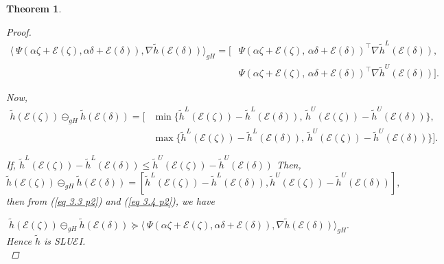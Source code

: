 \documentclass[12pt, reqno]{amsart}
\newtheorem{theorem}{Theorem}[section]
\theoremstyle{definition}
\theoremstyle{remark}
\numberwithin{equation}{section}
\begin{document}
\begin{theorem}
\begin{proof}
\begin{equation*}
\begin{aligned}
    \langle\ {\Psi}( {\alpha} \mathit{\zeta} + \mathcal{\mathcal{E}}(\mathit{\zeta} ), {\alpha}\mathit{\delta} + \mathcal{\mathcal{E}}(\mathit{\delta} )),\nabla  \tilde{h}( \mathcal{\mathcal{E}}(\mathit{\delta} ))\rangle_{gH}
    = \big[
    &\Psi(\alpha \mathit{\zeta}  + \mathcal{\mathcal{E}}(\mathit{\zeta} ),\, \alpha \mathit{\delta}  + \mathcal{\mathcal{E}}(\mathit{\delta} ))^{\!\top}
    \nabla \tilde{h}^L(\mathcal{\mathcal{E}}(\mathit{\delta} )), \\
    &\Psi(\alpha \mathit{\zeta}  + \mathcal{\mathcal{E}}(\mathit{\zeta} ),\, \alpha \mathit{\delta}  + \mathcal{\mathcal{E}}(\mathit{\delta} ))^{\!\top}
    \nabla \tilde{h}^U(\mathcal{\mathcal{E}}(\mathit{\delta} )) 
    \big].
\end{aligned}
\end{equation*}

Now,
\begin{equation*}
\begin{aligned}
\tilde{h}(\mathcal{E}(\zeta)) \ominus_{gH} \tilde{h}(\mathcal{E}(\delta))
= \Big[
    &\min\!\Big\{
        \tilde{h}^L(\mathcal{E}(\zeta)) - \tilde{h}^L(\mathcal{E}(\delta)),\,
        \tilde{h}^U(\mathcal{E}(\zeta)) - \tilde{h}^U(\mathcal{E}(\delta))
    \Big\}, \\
    &\max\!\Big\{
        \tilde{h}^L(\mathcal{E}(\zeta)) - \tilde{h}^L(\mathcal{E}(\delta)),\,
        \tilde{h}^U(\mathcal{E}(\zeta)) - \tilde{h}^U(\mathcal{E}(\delta))
    \Big\}
\Big].
\end{aligned}
\end{equation*}

If, $\tilde{h}^L(\mathcal{\mathcal{E}}(\mathit{\zeta} )) - \tilde{h}^L(\mathcal{\mathcal{E}}(\mathit{\delta} )) \leq \tilde{h}^U(\mathcal{\mathcal{E}}(\mathit{\zeta} )) - \tilde{h}^U(\mathcal{\mathcal{E}}(\mathit{\delta} ))$
Then,
\begin{equation*}
   \tilde{h}(\mathcal{\mathcal{E}}(\mathit{\zeta} )) \ominus_{gH}\tilde{h}(\mathcal{\mathcal{E}}(\mathit{\delta} )) = [\tilde{h}^L(\mathcal{\mathcal{E}}(\mathit{\zeta} )) - \tilde{h}^L(\mathcal{\mathcal{E}}(\mathit{\delta} )), \tilde{h}^U(\mathcal{\mathcal{E}}(\mathit{\zeta} )) - \tilde{h}^U(\mathcal{\mathcal{E}}(\mathit{\delta} ))],
\end{equation*} 
then from (\ref{eq 3.3 p2}) and (\ref{eq 3.4 p2}), we have

\begin{equation*}
   \tilde{h}(\mathcal{\mathcal{E}}(\mathit{\zeta} )) \ominus_{gH}\tilde{h}(\mathcal{\mathcal{E}}(\mathit{\delta} )) \succeq \langle\ {\Psi}( {\alpha} \mathit{\zeta} + \mathcal{\mathcal{E}}(\mathit{\zeta} ), {\alpha}\mathit{\delta} + \mathcal{\mathcal{E}}(\mathit{\delta} )),\nabla  \tilde{h}( \mathcal{\mathcal{E}}(\mathit{\delta} ))\rangle_{gH}.
\end{equation*}
Hence $\tilde{h}$ is SLU$\mathcal{\mathcal{E}}$I.\\
\vspace{0.1cm}


\end{proof}
\end{theorem}
\end{document}
